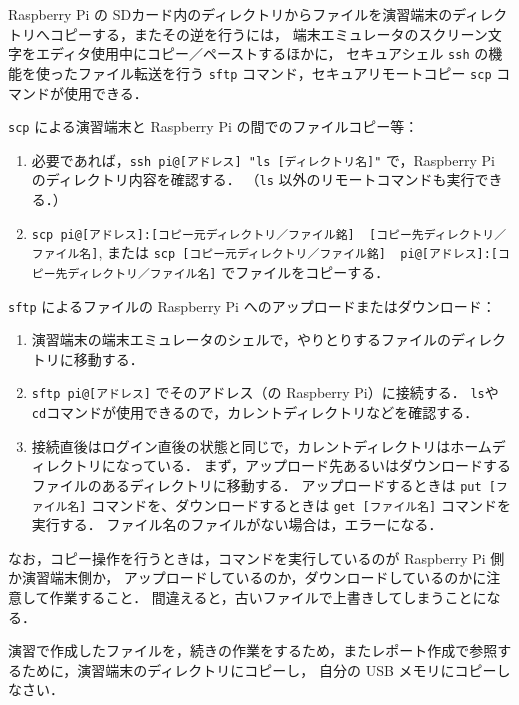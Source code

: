 \documentclass[11pt,a4,epsf]{report}
\begin{document}
Raspberry Pi の SDカード内のディレクトリからファイルを演習端末のディレクトリへコピーする，またその逆を行うには，
端末エミュレータのスクリーン文字をエディタ使用中にコピー／ペーストするほかに，
セキュアシェル \verb+ssh+ の機能を使ったファイル転送を行う \verb+sftp+ コマンド，セキュアリモートコピー \verb+scp+ コマンドが使用できる．

\verb+scp+ による演習端末と Raspberry Pi の間でのファイルコピー等：
\begin{enumerate}
\item
必要であれば，\verb+ssh pi@[アドレス] "ls [ディレクトリ名]"+ で，Raspberry Pi のディレクトリ内容を確認する．
（\verb+ls+ 以外のリモートコマンドも実行できる．）
\item
\verb+scp pi@[アドレス]:[コピー元ディレクトリ／ファイル銘]  [コピー先ディレクトリ／ファイル名]+, または
\verb+scp [コピー元ディレクトリ／ファイル銘]  pi@[アドレス]:[コピー先ディレクトリ／ファイル名]+ でファイルをコピーする．
\end{enumerate}

\verb+sftp+ によるファイルの Raspberry Pi へのアップロードまたはダウンロード：
\begin{enumerate}
\item
演習端末の端末エミュレータのシェルで，やりとりするファイルのディレクトリに移動する．
\item
\verb+sftp pi@[アドレス]+ でそのアドレス（の Raspberry Pi）に接続する．
\verb+ls+や\verb+cd+コマンドが使用できるので，カレントディレクトリなどを確認する．
\item
接続直後はログイン直後の状態と同じで，カレントディレクトリはホームディレクトリになっている．
まず，アップロード先あるいはダウンロードするファイルのあるディレクトリに移動する．
アップロードするときは \verb+put [ファイル名]+ コマンドを、ダウンロードするときは \verb+get [ファイル名]+ コマンドを実行する．
ファイル名のファイルがない場合は，エラーになる．
\end{enumerate}

なお，コピー操作を行うときは，コマンドを実行しているのが Raspberry Pi 側か演習端末側か，
アップロードしているのか，ダウンロードしているのかに注意して作業すること．
間違えると，古いファイルで上書きしてしまうことになる．

\begin{excercise}
演習で作成したファイルを，続きの作業をするため，またレポート作成で参照するために，演習端末のディレクトリにコピーし，
自分の USB メモリにコピーしなさい．
\end{excercise}
\end{document}
